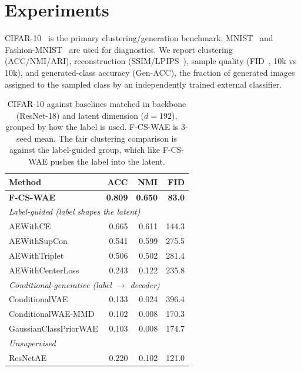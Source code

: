 \documentclass[letterpaper]{article} %
\newcommand{\ours}{F-CS-WAE}
\begin{document}
\section{Experiments}

CIFAR-10~\citep{krizhevsky2009learning} is the primary
clustering/generation benchmark; MNIST~\citep{lecun1998gradient} and
Fashion-MNIST~\citep{xiao2017fashion} are used for diagnostics. We report
clustering (ACC/NMI/ARI), reconstruction (SSIM/LPIPS~\citep{zhang2018unreasonable}),
sample quality (FID~\citep{heusel2017gans}, 10k vs 10k), and generated-class
accuracy (Gen-ACC), the fraction of generated images assigned to the sampled
class by an independently trained external classifier.

\begin{table}[t]
\centering
\small
\setlength{\tabcolsep}{5pt}
\caption{CIFAR-10 against baselines matched in backbone (ResNet-18) and
latent dimension ($d{=}192$), grouped by how the label is used. \ours{} is
3-seed mean. The fair clustering comparison is against the label-guided
group, which like \ours{} pushes the label into the latent.}
\label{tab:cifar-main}
\begin{tabular}{lrrr}
\toprule
Method & ACC & NMI & FID \\
\midrule
\textbf{\ours{}} & \textbf{0.809} & \textbf{0.650} & \textbf{83.0} \\
\midrule
\multicolumn{4}{l}{\emph{Label-guided (label shapes the latent)}} \\
AEWithCE & 0.665 & 0.611 & 144.3 \\
AEWithSupCon & 0.541 & 0.599 & 275.5 \\
AEWithTriplet & 0.506 & 0.502 & 281.4 \\
AEWithCenterLoss & 0.243 & 0.122 & 235.8 \\
\multicolumn{4}{l}{\emph{Conditional-generative (label $\to$ decoder)}} \\
ConditionalVAE & 0.133 & 0.024 & 396.4 \\
ConditionalWAE-MMD & 0.102 & 0.008 & 170.3 \\
GaussianClassPriorWAE & 0.103 & 0.008 & 174.7 \\
\multicolumn{4}{l}{\emph{Unsupervised}} \\
ResNetAE & 0.220 & 0.102 & 121.0 \\
\bottomrule
\end{tabular}
\end{table}
\end{document}
